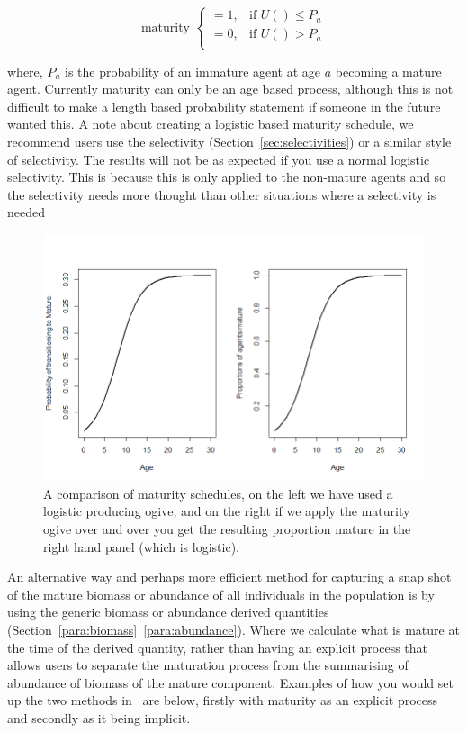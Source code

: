 \begin{equation}
	\text{maturity }\begin{cases}
	 = 1, & \text{if } U() \leq P_a\\
	 = 0, & \text{if } U() > P_a\\
	\end{cases}
\end{equation}

where, $P_a$ is the probability of an immature agent at age $a$ becoming a mature agent. Currently maturity can only be an age based process, although this is not difficult to make a length based probability statement if someone in the future wanted this. A note about creating a logistic based maturity schedule, we recommend users use the selectivity  (Section~\ref{sec:selectivities}) or a similar style of selectivity. The results will not be as expected if you use a normal logistic selectivity. This is because this is only applied to the non-mature agents and so the selectivity needs more thought than other situations where a selectivity is needed\\

\begin{figure}[htp]\label{fig:mature}
	\centering
	\includegraphics[scale=0.6]{Figures/maturity_ogives.png}%
	\caption{A comparison of maturity schedules, on the left we have used a logistic producing ogive, and on the right if we apply the maturity ogive over and over you get the resulting proportion mature in the right hand panel (which is logistic).}
\end{figure}


An alternative way and perhaps more efficient method for capturing a snap shot of the mature biomass or abundance of all individuals in the population is by using the generic biomass or abundance derived quantities (Section~\ref{para:biomass}~\ref{para:abundance}). Where we calculate what is mature at the time of the derived quantity, rather than having an explicit process that allows users to separate the maturation process from the summarising of abundance of biomass of the mature component. Examples of how you would set up the two methods in \IBM\ are below, firstly with maturity as an explicit process and secondly as it being implicit.

